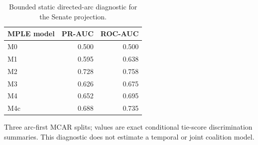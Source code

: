\begin{table}[tbp]
\centering
\small
\caption{Bounded static directed-arc diagnostic for the Senate projection.}
\label{tab:static-diagnostic}
\begin{tabular}{lrr}
\toprule
MPLE model & PR-AUC & ROC-AUC \\
\midrule
M0 & 0.500 & 0.500 \\
M1 & 0.595 & 0.638 \\
M2 & 0.728 & 0.758 \\
M3 & 0.626 & 0.675 \\
M4 & 0.652 & 0.695 \\
M4c & 0.688 & 0.735 \\
\bottomrule
\end{tabular}
\par\vspace{2pt}\footnotesize Three arc-first MCAR splits; values are exact conditional tie-score discrimination summaries. This diagnostic does not estimate a temporal or joint coalition model.
\end{table}
